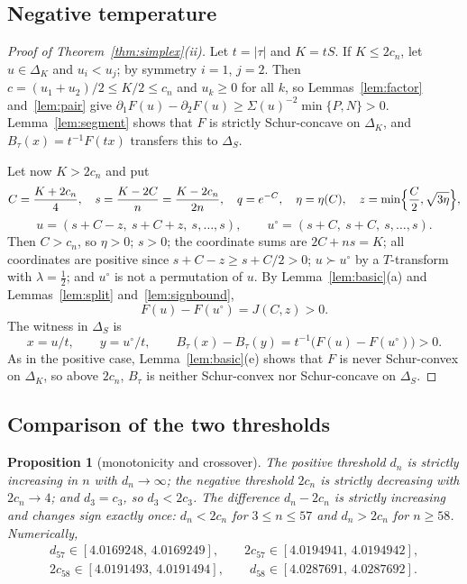 \documentclass[11pt,a4paper]{article}
\theoremstyle{plain}
\newtheorem{proposition}[theorem]{Proposition}
\theoremstyle{definition}
\newcommand{\maj}{\succ}
\newcommand{\Simp}{\Delta}
\begin{document}
\subsection{Negative temperature}

\begin{proof}[Proof of Theorem~\ref{thm:simplex}(ii)]
Let $t=|\tau|$ and $K=tS$. If $K\le 2c_n$, let $u\in\Simp_K$ and $u_i<u_j$; by symmetry $i=1$, $j=2$. Then $c=(u_1+u_2)/2\le K/2\le c_n$ and $u_k\ge 0$ for all $k$, so Lemmas~\ref{lem:factor} and~\ref{lem:pair} give $\partial_1F(u)-\partial_2F(u)\ge \Sigma(u)^{-2}\min\{P,N\}>0$. Lemma~\ref{lem:segment} shows that $F$ is strictly Schur-concave on $\Simp_K$, and $B_\tau(x)=t^{-1}F(tx)$ transfers this to $\Simp_S$.

Let now $K>2c_n$ and put
\begin{equation}\label{eq:simplex-neg-construction}
C=\frac{K+2c_n}{4},\quad s=\frac{K-2C}{n}=\frac{K-2c_n}{2n},\quad q=e^{-C},\quad \eta=\eta(C),\quad z=\min\Bigl\{\frac C2,\sqrt{3\eta}\Bigr\},
\end{equation}
\[
u=(s+C-z,\ s+C+z,\ s,\dots,s),\qquad u^\circ=(s+C,\ s+C,\ s,\dots,s).
\]
Then $C>c_n$, so $\eta>0$; $s>0$; the coordinate sums are $2C+ns=K$; all coordinates are positive since $s+C-z\ge s+C/2>0$; $u\maj u^\circ$ by a $T$-transform with $\lambda=\frac12$; and $u^\circ$ is not a permutation of $u$. By Lemma~\ref{lem:basic}(a) and Lemmas~\ref{lem:split} and~\ref{lem:signbound},
\[
F(u)-F(u^\circ)=J(C,z)>0 .
\]
The witness in $\Simp_S$ is
\begin{equation}\label{eq:simplex-neg-witness}
x=u/t,\qquad y=u^\circ/t,\qquad B_\tau(x)-B_\tau(y)=t^{-1}\bigl(F(u)-F(u^\circ)\bigr)>0 .
\end{equation}
As in the positive case, Lemma~\ref{lem:basic}(e) shows that $F$ is never Schur-convex on $\Simp_K$, so above $2c_n$, $B_\tau$ is neither Schur-convex nor Schur-concave on $\Simp_S$.
\end{proof}

\subsection{Comparison of the two thresholds}

\begin{proposition}[monotonicity and crossover]\label{prop:crossover}
The positive threshold $d_n$ is strictly increasing in $n$ with $d_n\to\infty$; the negative threshold $2c_n$ is strictly decreasing with $2c_n\to 4$; and $d_3=c_3$, so $d_3<2c_3$. The difference $d_n-2c_n$ is strictly increasing and changes sign exactly once: $d_n<2c_n$ for $3\le n\le 57$ and $d_n>2c_n$ for $n\ge 58$. Numerically,
\begin{gather*}
d_{57}\in[4.0169248,\,4.0169249],\qquad 2c_{57}\in[4.0194941,\,4.0194942],\\
2c_{58}\in[4.0191493,\,4.0191494],\qquad d_{58}\in[4.0287691,\,4.0287692].
\end{gather*}
\end{proposition}
\end{document}
